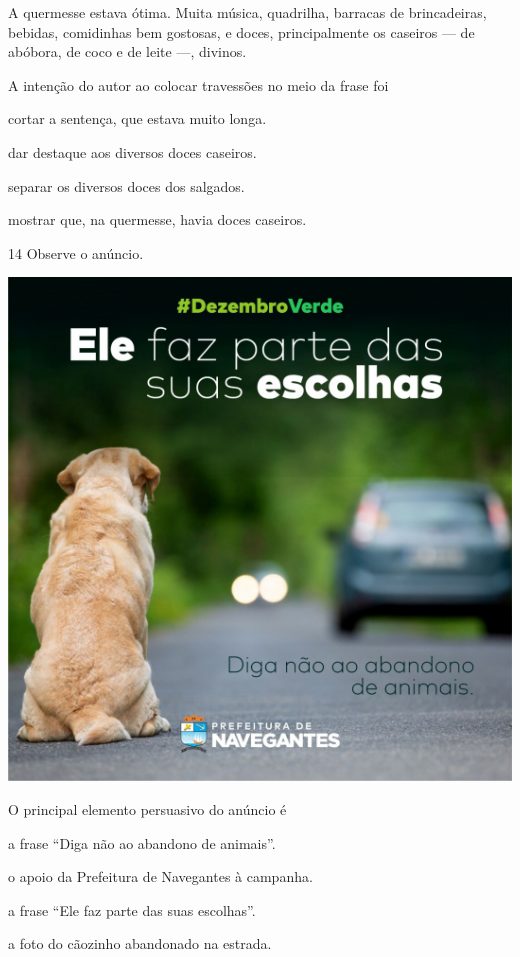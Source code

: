 \begin{myquote}
A quermesse estava ótima. Muita música, quadrilha, barracas de
brincadeiras, bebidas, comidinhas bem gostosas, e doces, principalmente
os caseiros --- de abóbora, de coco e de leite ---, divinos.

\end{myquote}

A intenção do autor ao colocar travessões no meio da frase foi

\begin{escolha}
\item cortar a sentença, que estava muito longa.

\item dar destaque aos diversos doces caseiros.

\item separar os diversos doces dos salgados.

\item mostrar que, na quermesse, havia doces caseiros.
\end{escolha}

\num{14} Observe o anúncio.
\vspace{2ex}

\begin{center}
\includegraphics[width=.6\textwidth]{./media/simulados/image6.png}
\end{center}

O principal elemento persuasivo do anúncio é

\begin{escolha}
\item a frase ``Diga não ao abandono de animais''.

\item o apoio da Prefeitura de Navegantes à campanha.

\item a frase ``Ele faz parte das suas escolhas''.

\item a foto do cãozinho abandonado na estrada.
\end{escolha}


